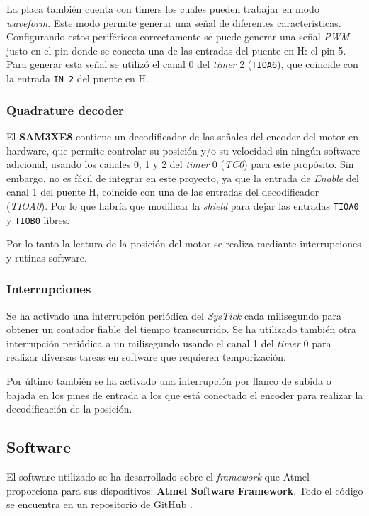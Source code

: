 \documentclass[a4paper]{article}
\begin{document}
La placa también cuenta con timers los cuales pueden trabajar en modo \emph{waveform}.
Este modo permite generar una señal de diferentes características.
Configurando estos periféricos correctamente se puede generar una señal \emph{PWM} justo en el pin donde se conecta una de las entradas del puente en H: el pin 5.
Para generar esta señal se utilizó el canal 0 del \emph{timer} 2 (\texttt{TIOA6}), que coincide con la entrada \texttt{IN\_2} del puente en H.

\subsubsection{Quadrature decoder}
El \textbf{SAM3XE8} contiene un decodificador de las señales del encoder del motor en hardware,
que permite controlar su posición y/o su velocidad sin ningún software adicional, usando los canales 0, 1 y 2 del \emph{timer} 0 (\emph{TC0}) para este propósito.
Sin embargo, no es fácil de integrar en este proyecto, ya que la entrada de \emph{Enable} del canal 1 del puente H, coincide con una de las entradas del decodificador (\emph{TIOA0}).
Por lo que habría que modificar la \emph{shield} para dejar las entradas \texttt{TIOA0} y \texttt{TIOB0} libres.

Por lo tanto la lectura de la posición del motor se realiza mediante interrupciones y rutinas software.

\subsubsection{Interrupciones}
Se ha activado una interrupción periódica del \emph{SysTick} cada milisegundo para obtener un contador fiable del tiempo transcurrido.
Se ha utilizado también otra interrupción periódica a un milisegundo usando el canal 1 del \emph{timer} 0 para realizar diversas tareas en software que requieren temporización.

Por último también se ha activado una interrupción por flanco de subida o bajada en los pines de entrada a los que está conectado el encoder para realizar la decodificación de la posición.

\subsection{Software \label{sec:software}}
El software utilizado se ha desarrollado sobre el \emph{framework} que Atmel proporciona para sus dispositivos: \textbf{Atmel Software Framework}.
Todo el código se encuentra en un repositorio de GitHub \cite{git}.
\end{document}
